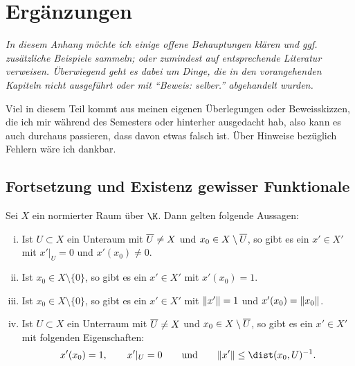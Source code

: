 \chapter{Ergänzungen}
{\itshape%
In diesem Anhang möchte ich einige offene Behauptungen klären und ggf.
zusätzliche Beispiele sammeln; oder zumindest auf entsprechende Literatur
verweisen. Überwiegend geht es dabei um Dinge, die in den vorangehenden
Kapiteln nicht ausgeführt oder mit \enquote{Beweis: selber.} abgehandelt
wurden.

Viel in diesem Teil kommt aus meinen eigenen Überlegungen oder Beweisskizzen,
die ich mir während des Semesters oder hinterher ausgedacht hab, also kann es
auch durchaus passieren, dass davon etwas falsch ist. Über Hinweise bezüglich
Fehlern wäre ich dankbar.%
}

\section{Fortsetzung und Existenz gewisser Funktionale}
\begin{thProposition} \label{a:exgewisserfunktionale}
    Sei $X$ ein normierter Raum über $\K$. Dann gelten folgende Aussagen:
    \begin{enumerate}[(i)]
        \item \label{a:exgewisserfunktionale:i}
            Ist $U\subset X$ ein Unteraum mit $\overline{U} \neq X$
            und $x_0\in X\setminus \overline{U}$, so gibt es ein $x'\in X'$
            mit $x'\vert_U = 0$ und $x'(x_0) \neq 0$.
            
        \item \label{a:exgewisserfunktionale:ii}
            Ist $x_0\in X\setminus\{0\}$, so gibt es ein $x'\in X'$
            mit $x'(x_0) = 1$.
            
        \item \label{a:exgewisserfunktionale:iii}
            Ist $x_0\in X\setminus\{0\}$, so gibt es ein $x'\in X'$
            mit $\lVert x'\rVert = 1$ und $x'(x_0) = \lVert x_0\rVert$.
            
        \item \label{a:exgewisserfunktionale:iv}
            Ist $U\subset X$ ein Unterraum mit $\overline{U} \neq X$
            und $x_0\in X\setminus \overline{U}$, so gibt es ein $x'\in X'$
            mit folgenden Eigenschaften:
            \[ x'(x_0)=1,\qquad
                x'\vert_U = 0 \qqtextqq{und}
                \norm{x'} \leq \dist(x_0, U)^{-1}
            . \]
    \end{enumerate}
\end{thProposition}

